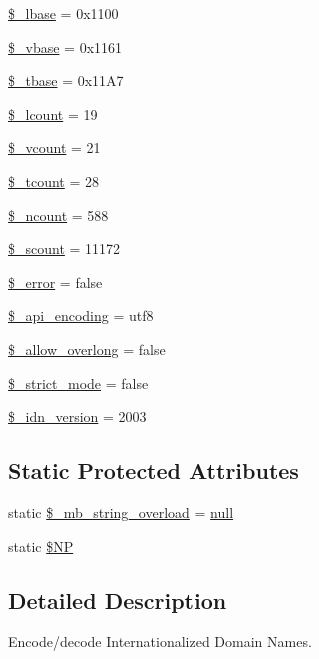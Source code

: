 \begin{DoxyCompactItemize}
\hyperlink{classidna__convert_a50c50cda465aefe78b8ed69ae6cd6247}{\$\+\_\+lbase} = 0x1100
\item 
\hyperlink{classidna__convert_a2e984a3fe1e2e4d5192dd9a5220e9c29}{\$\+\_\+vbase} = 0x1161
\item 
\hyperlink{classidna__convert_a5b728e6ff6e15773c914383a66651826}{\$\+\_\+tbase} = 0x11\+A7
\item 
\hyperlink{classidna__convert_ae191087842e21e5f56a0df02f922abbe}{\$\+\_\+lcount} = 19
\item 
\hyperlink{classidna__convert_afe217921aaa9aa954361f3aa090c69c1}{\$\+\_\+vcount} = 21
\item 
\hyperlink{classidna__convert_a81a70a95e18fde08ec6633f0095c92c6}{\$\+\_\+tcount} = 28
\item 
\hyperlink{classidna__convert_a0e6408f36ff8f150adb9d1a67c7fe3e2}{\$\+\_\+ncount} = 588
\item 
\hyperlink{classidna__convert_aa422586662f0878841bd8dcda663c058}{\$\+\_\+scount} = 11172
\item 
\hyperlink{classidna__convert_ae3825ac4f637ed992ef96f261647c396}{\$\+\_\+error} = false
\item 
\hyperlink{classidna__convert_abc9b2aaad4b02a40602f254ac44ab973}{\$\+\_\+api\+\_\+encoding} = \textquotesingle{}utf8\textquotesingle{}
\item 
\hyperlink{classidna__convert_a7a40288feb2a5635c567a28710017e56}{\$\+\_\+allow\+\_\+overlong} = false
\item 
\hyperlink{classidna__convert_a6457ade57cb55c7b44bfbf8686c2c2d5}{\$\+\_\+strict\+\_\+mode} = false
\item 
\hyperlink{classidna__convert_a14edc7c94d7c9c05a8a7eada24901dfd}{\$\+\_\+idn\+\_\+version} = 2003
\end{DoxyCompactItemize}
\subsection*{Static Protected Attributes}
\begin{DoxyCompactItemize}
\item 
static \hyperlink{classidna__convert_a36aba0d7717782343396a25026107dc7}{\$\+\_\+mb\+\_\+string\+\_\+overload} = \hyperlink{modernizr_8min_8js_a286f9ec831c5e676eeb493248eab9575}{null}
\item 
static \hyperlink{classidna__convert_a82881f4c426f3e6603e252c8bebc875f}{\$\+NP}
\end{DoxyCompactItemize}


\subsection{Detailed Description}
Encode/decode Internationalized Domain Names.

